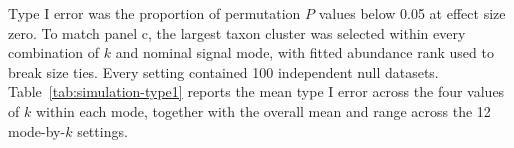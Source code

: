 Type I error was the proportion of permutation \(P\) values below 0.05 at
effect size zero. To match panel c, the largest taxon cluster was selected
within every combination of \(k\) and nominal signal mode, with fitted
abundance rank used to break size ties. Every setting contained 100
independent null datasets. Table~\ref{tab:simulation-type1} reports the mean
type I error across the four values of \(k\) within each mode, together with
the overall mean and range across the 12 mode-by-\(k\) settings.
